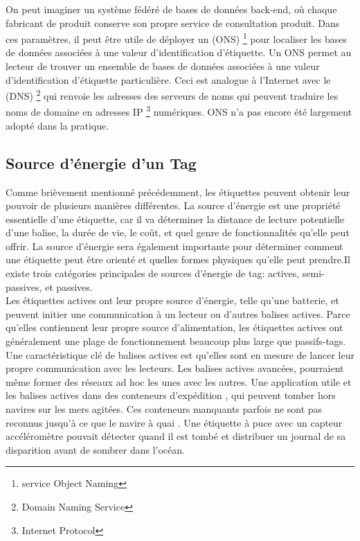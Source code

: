\documentclass[11pt, a4paper, twoside]{book}
\begin{document}
On peut imaginer un système fédéré de bases de données back-end, où chaque fabricant de produit conserve son propre service de consultation produit. Dans ces paramètres, il peut être utile de déployer un (ONS) \footnote{service Object Naming} pour localiser les bases de données associées à une valeur d'identification d'étiquette. Un ONS permet au lecteur de trouver un ensemble de bases de données associées à une valeur d'identification d'étiquette particulière. Ceci est analogue à l'Internet avec le (DNS) \footnote{Domain Naming Service} qui renvoie les adresses des serveurs de noms qui peuvent traduire les noms de domaine en adresses IP \footnote{Internet Protocol}  numériques. ONS n'a pas encore été largement adopté dans la pratique.
\subsection{Source d'énergie d'un Tag}
Comme brièvement mentionné précédemment, les étiquettes peuvent obtenir leur pouvoir de plusieurs manières différentes. La source d'énergie est une propriété essentielle d'une étiquette, car il va déterminer la distance de lecture potentielle d'une balise, la durée de vie, le coût, et quel genre de fonctionnalités qu'elle peut offrir. La source d'énergie sera également importante pour déterminer comment une étiquette peut être orienté et quelles formes physiques qu'elle peut prendre.Il existe trois catégories principales de sources d'énergie de tag: actives, semi-passives, et passives.\\

 Les étiquettes actives ont leur propre source d'énergie, telle qu'une batterie, et peuvent initier une communication à un lecteur ou d'autres balises actives. Parce qu'elles contiennent leur propre source d'alimentation, les étiquettes actives ont généralement une plage de fonctionnement beaucoup plus large que passifs-tags. Une caractéristique clé de balises actives est qu'elles sont en mesure de lancer leur propre communication avec les lecteurs. Les balises actives avancées, pourraient même former des réseaux ad hoc les unes avec les autres. Une application utile et les balises actives dans des conteneurs d'expédition , qui peuvent tomber hors navires sur les mers agitées. Ces conteneurs manquants parfois ne sont pas reconnus jusqu'à ce que le navire à quai . Une étiquette à puce avec un capteur accéléromètre pouvait détecter quand il est tombé et distribuer un journal de sa disparition avant de sombrer dans l'océan.\\
\end{document}
